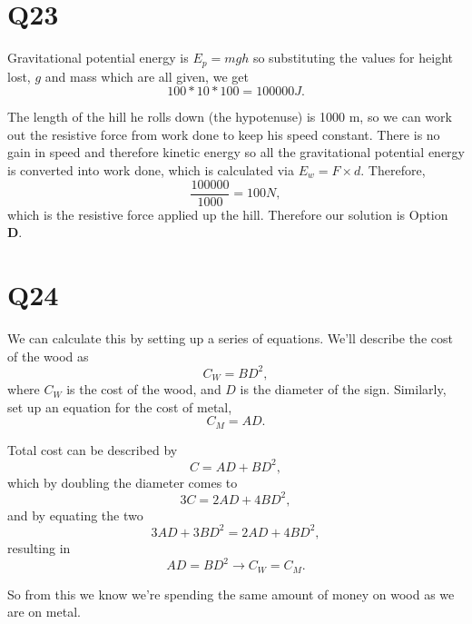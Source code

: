 \documentclass[11pt]{article}
\begin{document}
\section*{Q23}
Gravitational potential energy is $E_p = mgh$ so substituting the values for height lost, $g$ and mass which are all given, we get
\begin{equation*}
100*10*100 = 100000 J.
\end{equation*}

The length of the hill he rolls down (the hypotenuse) is 1000 m, so we can work out the resistive force from work done to keep his speed constant.  There is no gain in speed and therefore kinetic energy so all the gravitational potential energy is converted into work done, which is calculated via $E_w = F \times d$.  Therefore,
\begin{equation*}
\frac{100000}{1000} = 100 N,
\end{equation*}
which is the resistive force applied up the hill.  Therefore our solution is Option \textbf{D}.

\section*{Q24}
We can calculate this by setting up a series of equations.  We'll describe the cost of the wood as
\begin{equation*}
C_W = BD^2,
\end{equation*}
where $C_W$ is the cost of the wood, and $D$ is the diameter of the sign.  Similarly, set up an equation for the cost of metal,
\begin{equation*}
C_M = AD.
\end{equation*}

Total cost can be described by
\begin{equation*}
C = AD + BD^2,
\end{equation*}
which by doubling the diameter comes to
\begin{equation*}
3C = 2AD + 4BD^2, 
\end{equation*}
and by equating the two
\begin{equation*}
3AD + 3BD^2 = 2AD + 4BD^2, 
\end{equation*}
resulting in
\begin{equation*}
AD = BD^2 \rightarrow C_W = C_M.
\end{equation*}

So from this we know we're spending the same amount of money on wood as we are on metal.
\end{document}
